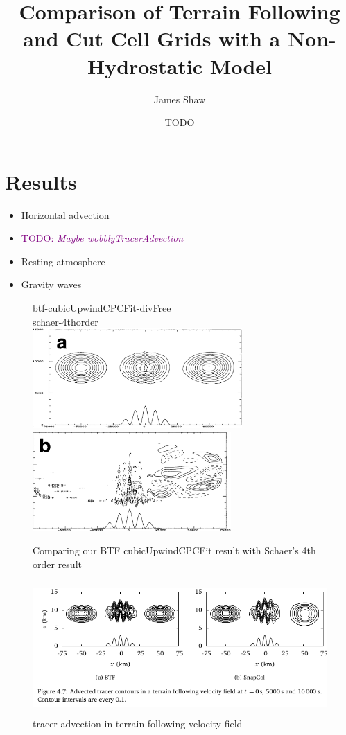 \documentclass[a4paper]{article}
\title{Comparison of Terrain Following and Cut Cell Grids with a Non-Hydrostatic Model}
\author{James Shaw}
\date{TODO}
\begin{document}
\newcommand{\TODO}[1]{\textcolor{purple}{TODO: \emph{#1}}}
\newcommand{\textcite}[1]{\textbf{#1}}

\maketitle

\section{Results}

\begin{itemize}
	\item Horizontal advection
	\item \TODO{Maybe wobblyTracerAdvection}
	\item Resting atmosphere
	\item Gravity waves
\end{itemize}

\begin{figure}
	btf-cubicUpwindCPCFit-divFree \\
	
	

	schaer-4thorder \\
	\includegraphics[height=1.5in]{schaer-btf-4thorder.png}
	\includegraphics[height=1.5in]{schaer-btf-4thorder-error.png}
%
	\caption{Comparing our BTF cubicUpwindCPCFit result with Schaer's 4th order result}
	\label{fig:advection}
\end{figure}

\begin{figure}
	\includegraphics[height=2in]{wobblyTracerAdvection.png}
%
	\caption{tracer advection in terrain following velocity field}
	\label{fig:wobblyTracerAdvection}
\end{figure}
\end{document}
